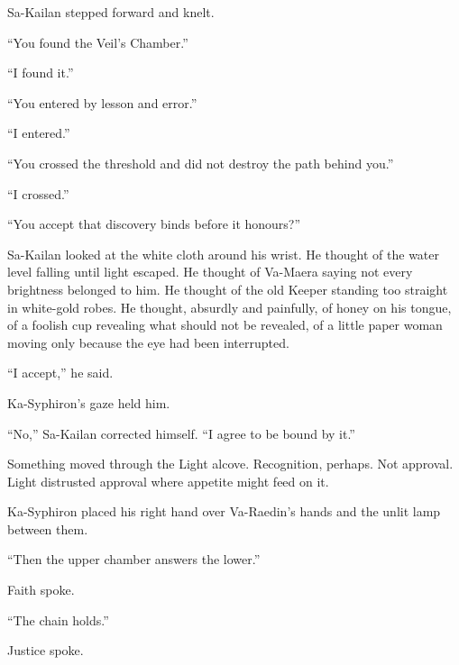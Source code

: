 Sa-Kailan stepped forward and knelt.\par

“You found the Veil’s Chamber.”\par

“I found it.”\par

“You entered by lesson and error.”\par

“I entered.”\par

“You crossed the threshold and did not destroy the path behind you.”\par

“I crossed.”\par

“You accept that discovery binds before it honours?”\par

Sa-Kailan looked at the white cloth around his wrist. He thought of the water level falling until light escaped. He thought of Va-Maera saying not every brightness belonged to him. He thought of the old Keeper standing too straight in white-gold robes. He thought, absurdly and painfully, of honey on his tongue, of a foolish cup revealing what should not be revealed, of a little paper woman moving only because the eye had been interrupted.\par

“I accept,” he said.\par

Ka-Syphiron’s gaze held him.\par

“No,” Sa-Kailan corrected himself. “I agree to be bound by it.”\par

Something moved through the Light alcove. Recognition, perhaps. Not approval. Light distrusted approval where appetite might feed on it.\par

Ka-Syphiron placed his right hand over Va-Raedin’s hands and the unlit lamp between them.\par

“Then the upper chamber answers the lower.”\par

Faith spoke.\par

“The chain holds.”\par

Justice spoke.\par

